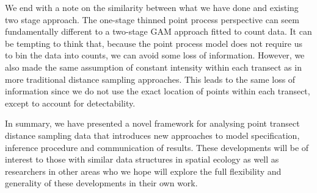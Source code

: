 \documentclass[preprint,12pt]{elsarticle}
\begin{document}
We end with a note on the similarity between what we have done and existing two stage approach.  The one-stage thinned point process perspective can seem fundamentally different to a two-stage GAM approach fitted to count data.  It can be tempting to think that, because the point process model does not require us to bin the data into counts, we can avoid some loss of information.  However, we also made the same assumption of constant intensity within each transect as in more traditional distance sampling approaches.  This leads to the same loss of information since we do not use the exact location of points within each transect, except to account for detectability.

In summary, we have presented a novel framework for analysing point transect distance sampling data that introduces new approaches to model specification, inference procedure and communication of results.  These developments will be of interest to those with similar data structures in spatial ecology as well as researchers in other areas who we hope will explore the full flexibility and generality of these developments in their own work.    


\clearpage


\end{document}
